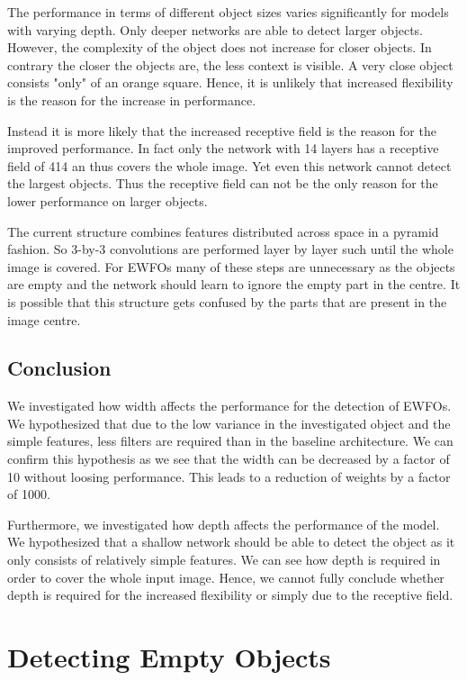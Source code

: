 	The performance in terms of different object sizes varies significantly for models with varying depth. Only deeper networks are able to detect larger objects. However, the complexity of the object does not increase for closer objects. In contrary the closer the objects are, the less context is visible. A very close object consists "only" of an orange square. Hence, it is unlikely that increased flexibility is the reason for the increase in performance. 
	
	Instead it is more likely that the increased receptive field is the reason for the improved performance. In fact only the network with 14 layers has a receptive field of 414 an thus covers the whole image. Yet even this network cannot detect the largest objects. Thus the receptive field can not be the only reason for the lower performance on larger objects.
	
	The current structure combines features distributed across space in a pyramid fashion. So 3-by-3 convolutions are performed layer by layer such until the whole image is covered. For \acp{EWFO} many of these steps are unnecessary as the objects are empty and the network should learn to ignore the empty part in the centre. It is possible that this structure gets confused by the parts that are present in the image centre.
	
	\subsection{Conclusion}
	
	We investigated how width affects the performance for the detection of \acp{EWFO}. We hypothesized that due to the low variance in the investigated object and the simple features, less filters are required than in the baseline architecture. We can confirm this hypothesis as we see that the width can be decreased by a factor of 10 without loosing performance. This leads to a reduction of weights by a factor of 1000. 
	
	Furthermore, we investigated how depth affects the performance of the model. We hypothesized that a shallow network should be able to detect the object as it only consists of relatively simple features. We can see how depth is required in order to cover the whole input image. Hence, we cannot fully conclude whether depth is required for the increased flexibility or simply due to the receptive field. 
	
	
	\section{Detecting Empty Objects}
	
